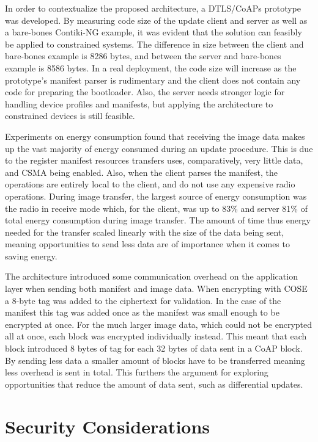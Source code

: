 \documentclass[0-thesis.tex]{subfiles}
\begin{document}
In order to contextualize the proposed architecture, a DTLS/CoAPs prototype was developed.
By measuring code size of the update client and server as well as a bare-bones Contiki-NG
example, it was evident that the solution can feasibly be applied to constrained systems.
The difference in size between the client and bare-bones example is 8286 bytes, and
between the server and bare-bones example is 8586 bytes. In a real deployment, the code
size will increase as the prototype's manifest parser is rudimentary and the client does
not contain any code for preparing the bootloader. Also, the server needs stronger logic
for handling device profiles and manifests, but applying the architecture to constrained
devices is still feasible.

Experiments on energy consumption found that receiving the image data makes up the vast
majority of energy consumed during an update procedure. This is due to the register
manifest resources transfers uses, comparatively, very little data, and CSMA being
enabled. Also, when the client parses the manifest, the operations are entirely local to
the client, and do not use any expensive radio operations. During image transfer, the
largest source of energy consumption was the radio in receive mode which, for the client,
was up to 83\% and server 81\% of total energy consumption during image transfer. The
amount of time thus energy needed for the transfer scaled linearly with the size of the
data being sent, meaning opportunities to send less data are of importance when it comes
to saving energy.

The architecture introduced some communication overhead on the application layer when
sending both manifest and image data. When encrypting with COSE a 8-byte tag was added to
the ciphertext for validation. In the case of the manifest this tag was added once as the
manifest was small enough to be encrypted at once. For the much larger image data, which
could not be encrypted all at once, each block was encrypted individually instead. This
meant that each block introduced 8 bytes of tag for each 32 bytes of data sent in a CoAP
block. By sending less data a smaller amount of blocks have to be transferred meaning less
overhead is sent in total. This furthers the argument for exploring opportunities that
reduce the amount of data sent, such as differential updates.

\section{Security Considerations}
\label{sec:security-considerations}
\end{document}
